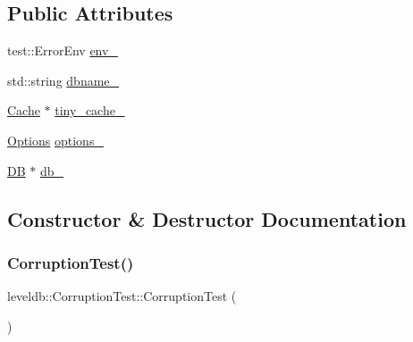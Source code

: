 \subsection*{Public Attributes}
\begin{DoxyCompactItemize}
\item 
test\+::\+Error\+Env \mbox{\hyperlink{classleveldb_1_1_corruption_test_a9ea05b88e4240ace348f542b43d59281}{env\+\_\+}}
\item 
std\+::string \mbox{\hyperlink{classleveldb_1_1_corruption_test_a533997a5fb977df165da8d92b6e9914a}{dbname\+\_\+}}
\item 
\mbox{\hyperlink{classleveldb_1_1_cache}{Cache}} $\ast$ \mbox{\hyperlink{classleveldb_1_1_corruption_test_afc8ff2f272ee3da2756acc21c37750d5}{tiny\+\_\+cache\+\_\+}}
\item 
\mbox{\hyperlink{structleveldb_1_1_options}{Options}} \mbox{\hyperlink{classleveldb_1_1_corruption_test_a6d639ef3ec7f1009447b85f9a10f90ac}{options\+\_\+}}
\item 
\mbox{\hyperlink{classleveldb_1_1_d_b}{DB}} $\ast$ \mbox{\hyperlink{classleveldb_1_1_corruption_test_a8bfd06bc0008cddb00e9492648bfca79}{db\+\_\+}}
\end{DoxyCompactItemize}


\subsection{Constructor \& Destructor Documentation}
\mbox{\label{classleveldb_1_1_corruption_test_a9940767db260b1e4e60b8bcedc50217c}} 
\subsubsection{\texorpdfstring{CorruptionTest()}{CorruptionTest()}}
{\footnotesize\ttfamily leveldb\+::\+Corruption\+Test\+::\+Corruption\+Test (\begin{DoxyParamCaption}{ }\end{DoxyParamCaption})\hspace{0.3cm}{\ttfamily [inline]}}


